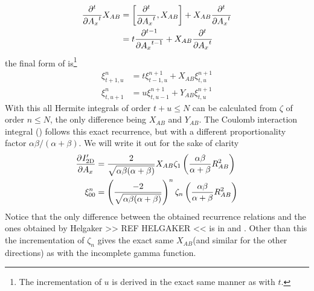         \begin{align}
            \prd{A_x}[][t] X_{AB} &= \left[\prd{A_x}[][t], X_{AB}\right] +
            X_{AB}\prd{A_x}[][t] \nonumber \\
            &= t\prd{A_x}[][t-1] + X_{AB}\prd{A_x}[][t]
        \end{align}
    the final form of  is\footnote{The incrementation of $u$ is
    derived in the exact same manner as with $t$.}
        \begin{equation}
            \begin{aligned}
                \xi^n_{t+1,u} &= t\xi^{n+1}_{t-1,u} + X_{AB}\xi^{n+1}_{t,u} \\
                \xi^n_{t,u+1} &= u\xi^{n+1}_{t,u-1} + Y_{AB}\xi^{n+1}_{t,u}
            \end{aligned}
        \end{equation}
    With this all Hermite integrals of order $t+u\leq N$ can be calculated from
    $\zeta$ of order $n\leq N$, the only difference being $X_{AB}$ and
    $Y_{AB}$. The Coulomb interaction integral
    () follows this exact recurrence, but
    with a different proportionality factor $\alpha\beta/(\alpha+\beta)$. We
    will write it out for the sake of clarity
        \begin{equation}
            \begin{aligned}
                \prd{A_x}[I'_{\text{2D}}] &=
                \frac{2}{\sqrt{\alpha\beta(\alpha+\beta)}}
                X_{AB}\zeta_1\left(\frac{\alpha\beta}{\alpha+\beta}R^2_{AB}\right)
                \\
                \xi^n_{00} &=
                \left(\frac{-2}{\sqrt{\alpha\beta(\alpha+\beta)}}\right)^n
                \zeta_n\left(\frac{\alpha\beta}{\alpha+\beta} R^2_{AB}\right)
            \end{aligned}
            \label{eq:recurrInteraction}
        \end{equation}
    Notice that the only difference between the obtained recurrence relations
    and the ones obtained by Helgaker >> REF HELGAKER << is in
     and . Other than this the
    incrementation of $\zeta_n$ gives the exact same $X_{AB}$(and similar for
    the other directions) as with the incomplete gamma function.

% 

